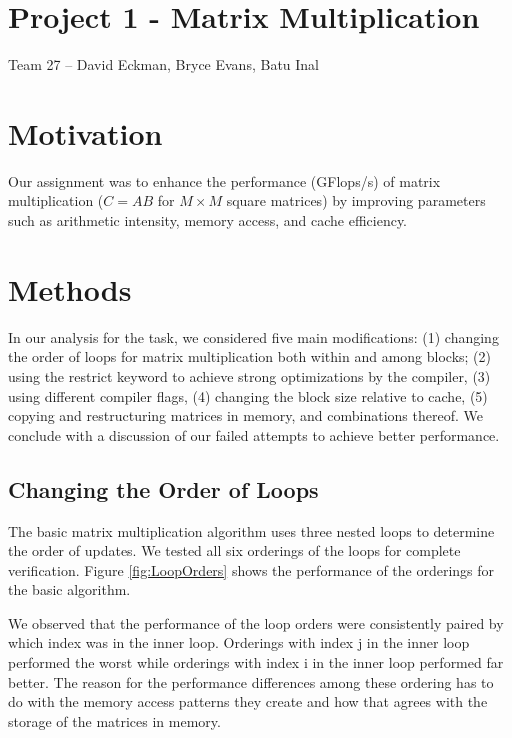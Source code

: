 \documentclass[12pt]{article}
\begin{document}
\setlength{\parindent}{24pt}


\section*{Project 1 - Matrix Multiplication}
Team 27 \--- David Eckman, Bryce Evans, Batu Inal

\section{Motivation}

Our assignment was to enhance the performance (GFlops/s) of matrix multiplication ($C = AB$ for $M \times M$ square matrices) by improving parameters such as arithmetic intensity, memory access, and cache efficiency.

\section{Methods}

In our analysis for the task, we considered five main modifications: (1) changing the order of loops for matrix multiplication both within and among blocks; (2) using the restrict keyword to achieve strong optimizations by the compiler, (3) using different compiler flags, (4) changing the block size relative to cache, (5) copying and restructuring matrices in memory, and combinations thereof. We conclude with a discussion of our failed attempts to achieve better performance.

\subsection{Changing the Order of Loops}

The basic matrix multiplication algorithm uses three nested loops to determine the order of updates.
We tested all six orderings of the loops for complete verification. 
Figure \ref{fig:LoopOrders} shows the performance of the orderings for the basic algorithm.

We observed that the performance of the loop orders were consistently paired by which index was in the inner loop.
Orderings with index j in the inner loop performed the worst while orderings with index i in the inner loop performed far better.
The reason for the performance differences among these ordering has to do with the memory access patterns they create and how that agrees with the storage of the matrices in memory.
\end{document}
